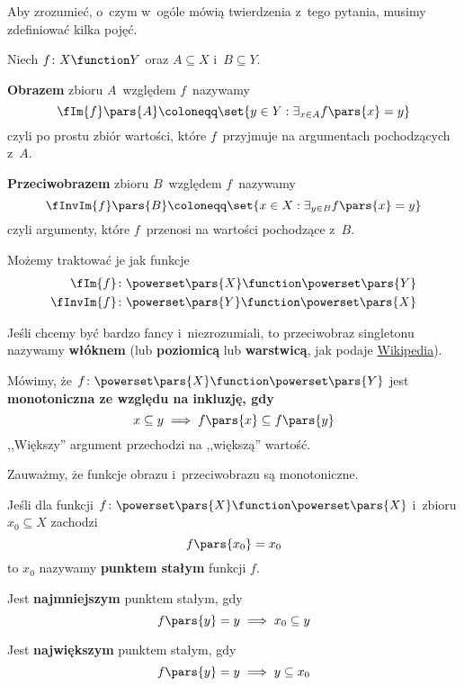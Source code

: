 Aby zrozumieć, o~czym w~ogóle mówią twierdzenia z~tego pytania, musimy zdefiniować kilka pojęć.
\begin{definition}
	Niech \(f\colon X \function Y\) oraz \(A \subseteq X\) i~\(B \subseteq Y\).

	\textbf{Obrazem} zbioru \(A\)~względem \(f\)~nazywamy
	\begin{equation*}
		\fIm{f}\pars{A} \coloneqq \set{y \in Y : \exists_{x \in A} f\pars{x} = y}
	\end{equation*}
	czyli po prostu zbiór wartości, które \(f\)~przyjmuje na argumentach pochodzących z~\(A\).

	\textbf{Przeciwobrazem} zbioru \(B\)~względem \(f\)~nazywamy
	\begin{equation*}
		\fInvIm{f}\pars{B} \coloneqq \set{x \in X : \exists_{y \in B} f\pars{x} = y}
	\end{equation*}
	czyli argumenty, które \(f\)~przenosi na wartości pochodzące z~\(B\).

	Możemy traktować je jak funkcje
	\begin{align*}
		\fIm{f}    & \colon \powerset\pars{X} \function \powerset\pars{Y} \\
		\fInvIm{f} & \colon \powerset\pars{Y} \function \powerset\pars{X}
	\end{align*}

	Jeśli chcemy być bardzo fancy i~niezrozumiali, to przeciwobraz singletonu nazywamy \textbf{włóknem} (lub \textbf{poziomicą} lub \textbf{warstwicą}, jak podaje \href{https://pl.wikipedia.org/wiki/Przeciwobraz}{Wikipedia}).
\end{definition}

\begin{definition}[Monotoniczność]
	Mówimy, że \(f\colon \powerset\pars{X} \function \powerset\pars{Y}\) jest \textbf{monotoniczna ze względu na inkluzję, gdy}
	\begin{equation*}
		x \subseteq y \implies f\pars{x} \subseteq f\pars{y}
	\end{equation*}
	,,Większy'' argument przechodzi na ,,większą'' wartość.
\end{definition}
Zauważmy, że funkcje obrazu i~przeciwobrazu są monotoniczne.

\begin{definition}
	Jeśli dla funkcji \(f\colon \powerset\pars{X} \function \powerset\pars{X}\) i~zbioru \(x_0 \subseteq X\) zachodzi
	\begin{equation*}
		f\pars{x_0} = x_0
	\end{equation*}
	to \(x_0\) nazywamy \textbf{punktem stałym} funkcji \(f\).

	Jest \textbf{najmniejszym} punktem stałym, gdy
	\begin{equation*}
		f\pars{y} = y \implies x_0 \subseteq y
	\end{equation*}

	Jest \textbf{największym} punktem stałym, gdy
	\begin{equation*}
		f\pars{y} = y \implies y \subseteq x_0
	\end{equation*}
\end{definition}
